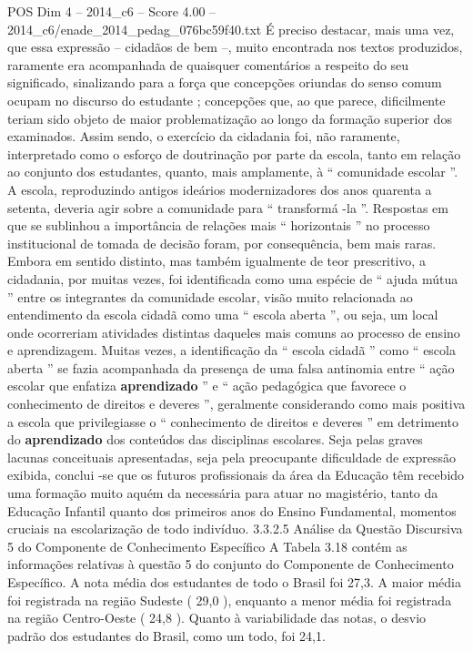 \begin{textsample}{POS Dim 4 – 2014\_c6 – Score 4.00 – 2014\_c6/enade\_2014\_pedag\_076bc59f40.txt}
É preciso destacar, mais uma vez, que essa expressão – cidadãos de bem –, muito encontrada nos textos produzidos, raramente era acompanhada de quaisquer comentários a respeito do seu significado, sinalizando para a força que concepções oriundas do senso comum ocupam no discurso do estudante ; concepções que, ao que parece, dificilmente teriam sido objeto de maior problematização ao longo da formação superior dos examinados.
Assim sendo, o exercício da cidadania foi, não raramente, interpretado como o esforço de doutrinação por parte da escola, tanto em relação ao conjunto dos estudantes, quanto, mais amplamente, à “ comunidade escolar ”.
A escola, reproduzindo antigos ideários modernizadores dos anos quarenta a setenta, deveria agir sobre a comunidade para “ transformá -la ”.
Respostas em que se sublinhou a importância de relações mais “ horizontais ” no processo institucional de tomada de decisão foram, por consequência, bem mais raras.
Embora em sentido distinto, mas também igualmente de teor prescritivo, a cidadania, por muitas vezes, foi identificada como uma espécie de “ ajuda mútua ” entre os integrantes da comunidade escolar, visão muito relacionada ao entendimento da escola cidadã como uma “ escola aberta ”, ou seja, um local onde ocorreriam atividades distintas daqueles mais comuns ao processo de ensino e aprendizagem.
Muitas vezes, a identificação da “ escola cidadã ” como “ escola aberta ” se fazia acompanhada da presença de uma falsa antinomia entre “ ação escolar que enfatiza \textbf{aprendizado} ” e “ ação pedagógica que favorece o conhecimento de direitos e deveres ”, geralmente considerando como mais positiva a escola que privilegiasse o “ conhecimento de direitos e deveres ” em detrimento do \textbf{aprendizado} dos conteúdos das disciplinas escolares.
Seja pelas graves lacunas conceituais apresentadas, seja pela preocupante dificuldade de expressão exibida, conclui -se que os futuros profissionais da área da Educação têm recebido uma formação muito aquém da necessária para atuar no magistério, tanto da Educação Infantil quanto dos primeiros anos do Ensino Fundamental, momentos cruciais na escolarização de todo indivíduo. 3.3.2.5 Análise da Questão Discursiva 5 do Componente de Conhecimento Específico A Tabela 3.18 contém as informações relativas à questão 5 do conjunto do Componente de Conhecimento Específico.
A nota média dos estudantes de todo o Brasil foi 27,3.
A maior média foi registrada na região Sudeste ( 29,0 ), enquanto a menor média foi registrada na região Centro-Oeste ( 24,8 ).
Quanto à variabilidade das notas, o desvio padrão dos estudantes do Brasil, como um todo, foi 24,1.

\end{textsample}
